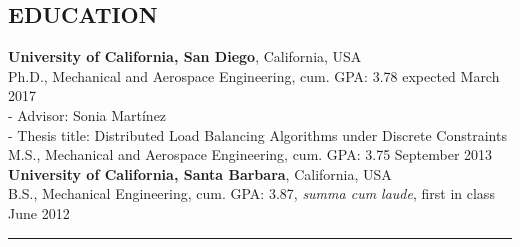 \documentclass{res}
\begin{document}
\begin{resume}
\section{EDUCATION} 
\vspace{1ex}
\textbf{University of California, San Diego}, California, USA  \\
\vspace{0ex}
\quad Ph.D., Mechanical and Aerospace Engineering, cum. GPA: 3.78 \hfill expected March 2017 \\
\vspace{0ex}
\qquad - Advisor: Sonia Mart\'inez \\
\vspace{0ex}
\qquad - Thesis title: Distributed Load Balancing Algorithms under Discrete Constraints \\
\vspace{.5ex}
\quad M.S., Mechanical and Aerospace Engineering, cum. GPA: 3.75 \hfill September 2013 \\
%
\vspace*{.5ex}
\textbf{University of California, Santa Barbara}, California, USA \\
\vspace*{.5ex}
\quad B.S., Mechanical Engineering, cum. GPA: 3.87, \textit{summa cum laude}, first in class \hfill June 2012 \\

 \vspace*{-6ex}
\hspace{-8.5ex}\rule{16.5cm}{0.4pt}
 \vspace*{-3ex}

\end{resume}
\end{document}
